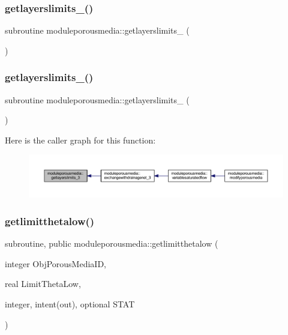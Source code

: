 \subsubsection{\texorpdfstring{getlayerslimits\+\_()}{getlayerslimits\_2()}}
{\footnotesize\ttfamily subroutine moduleporousmedia\+::getlayerslimits\+\_ (\begin{DoxyParamCaption}{ }\end{DoxyParamCaption})\hspace{0.3cm}{\ttfamily [private]}}

\mbox{\label{namespacemoduleporousmedia_a68ea6f414786e8b58ce6e1091b663f76}} 
\subsubsection{\texorpdfstring{getlayerslimits\+\_()}{getlayerslimits\_3()}}
{\footnotesize\ttfamily subroutine moduleporousmedia\+::getlayerslimits\+\_ (\begin{DoxyParamCaption}{ }\end{DoxyParamCaption})\hspace{0.3cm}{\ttfamily [private]}}

Here is the caller graph for this function\+:\nopagebreak
\begin{figure}[H]
\begin{center}
\leavevmode
\includegraphics[width=350pt]{namespacemoduleporousmedia_a68ea6f414786e8b58ce6e1091b663f76_icgraph}
\end{center}
\end{figure}
\mbox{\label{namespacemoduleporousmedia_a3070d5af7ef46dbbb22e63098a25f566}} 
\subsubsection{\texorpdfstring{getlimitthetalow()}{getlimitthetalow()}}
{\footnotesize\ttfamily subroutine, public moduleporousmedia\+::getlimitthetalow (\begin{DoxyParamCaption}\item[{integer}]{Obj\+Porous\+Media\+ID,  }\item[{real}]{Limit\+Theta\+Low,  }\item[{integer, intent(out), optional}]{S\+T\+AT }\end{DoxyParamCaption})}


